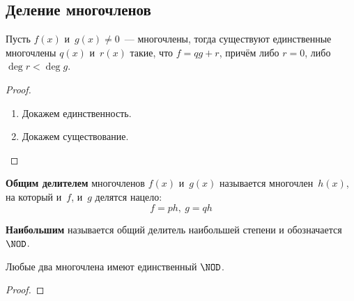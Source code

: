 \subsection{Деление многочленов}
\begin{theorem}
Пусть $f(x)$ и~$g(x) \neq 0$~--- многочлены, тогда существуют единственные многочлены $q(x)$ и~$r(x)$ такие, что $f = qg + r$, причём либо $r = 0$, либо $\deg r < \deg g$.
\end{theorem}
\begin{proof}
\begin{enumerate}
	\item Докажем единственность.
	
	\item Докажем существование.
	
\end{enumerate}
\end{proof}

\textbf{Общим делителем} многочленов $f(x)$ и~$g(x)$ называется многочлен~$h(x)$, на который и~$f$, и~$g$ делятся нацело:
\begin{equation*}
f = ph, \ g = qh
\end{equation*}

\textbf{Наибольшим} называется общий делитель наибольшей степени и обозначается $\NOD$.

\begin{theorem}
Любые два многочлена имеют единственный $\NOD$.
\end{theorem}
\begin{proof}

\end{proof}